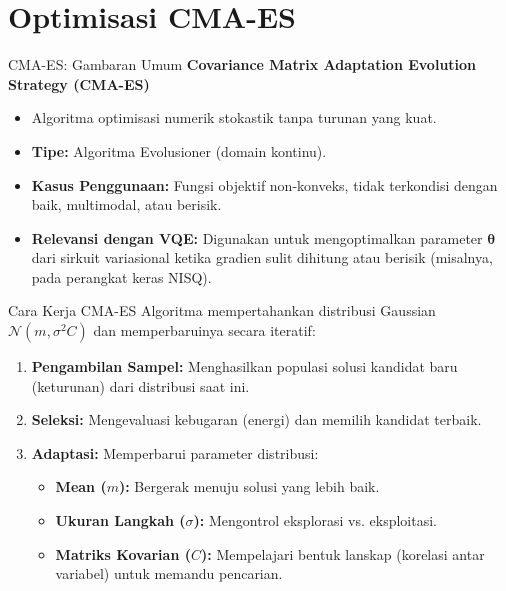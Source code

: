 \section{Optimisasi CMA-ES}

\begin{frame}{CMA-ES: Gambaran Umum}
    \textbf{Covariance Matrix Adaptation Evolution Strategy (CMA-ES)}
    \vspace{0.5cm}
    \begin{itemize}
        \item Algoritma optimisasi numerik stokastik tanpa turunan yang kuat.
        \item \textbf{Tipe:} Algoritma Evolusioner (domain kontinu).
        \item \textbf{Kasus Penggunaan:} Fungsi objektif non-konveks, tidak terkondisi dengan baik, multimodal, atau berisik.
        \item \textbf{Relevansi dengan VQE:} Digunakan untuk mengoptimalkan parameter $\boldsymbol{\theta}$ dari sirkuit variasional ketika gradien sulit dihitung atau berisik (misalnya, pada perangkat keras NISQ).
    \end{itemize}
\end{frame}

\begin{frame}{Cara Kerja CMA-ES}
    Algoritma mempertahankan distribusi Gaussian $\mathcal{N}(m, \sigma^2 C)$ dan memperbaruinya secara iteratif:
    \vspace{0.3cm}
    \begin{enumerate}
        \item \textbf{Pengambilan Sampel:} Menghasilkan populasi solusi kandidat baru (keturunan) dari distribusi saat ini.
        \item \textbf{Seleksi:} Mengevaluasi kebugaran (energi) dan memilih kandidat terbaik.
        \item \textbf{Adaptasi:} Memperbarui parameter distribusi:
            \begin{itemize}
                \item \textbf{Mean ($m$):} Bergerak menuju solusi yang lebih baik.
                \item \textbf{Ukuran Langkah ($\sigma$):} Mengontrol eksplorasi vs. eksploitasi.
                \item \textbf{Matriks Kovarian ($C$):} Mempelajari bentuk lanskap (korelasi antar variabel) untuk memandu pencarian.
            \end{itemize}
    \end{enumerate}
\end{frame}


